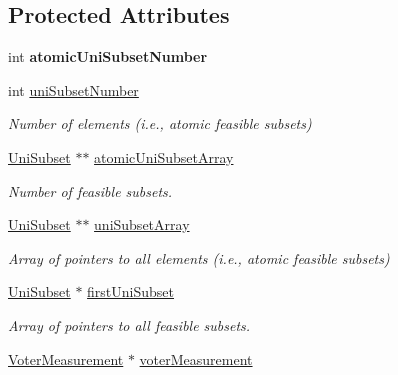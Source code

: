 \subsection*{Protected Attributes}
\begin{DoxyCompactItemize}
\item 
\hypertarget{classUniSet_addac67921c058dc9ffa2074b3d59151f}{int {\bfseries atomic\-Uni\-Subset\-Number}}\label{classUniSet_addac67921c058dc9ffa2074b3d59151f}

\item 
\hypertarget{classUniSet_a159ec0413efd05616c2f2445b7d8b2b5}{int \hyperlink{classUniSet_a159ec0413efd05616c2f2445b7d8b2b5}{uni\-Subset\-Number}}\label{classUniSet_a159ec0413efd05616c2f2445b7d8b2b5}

\begin{DoxyCompactList}\small\item\em Number of elements (i.\-e., atomic feasible subsets) \end{DoxyCompactList}\item 
\hypertarget{classUniSet_a16746d02b5503c5d8c62fe4dff46c5b3}{\hyperlink{classUniSubset}{Uni\-Subset} $\ast$$\ast$ \hyperlink{classUniSet_a16746d02b5503c5d8c62fe4dff46c5b3}{atomic\-Uni\-Subset\-Array}}\label{classUniSet_a16746d02b5503c5d8c62fe4dff46c5b3}

\begin{DoxyCompactList}\small\item\em Number of feasible subsets. \end{DoxyCompactList}\item 
\hypertarget{classUniSet_a154ae422d9f248c8b50f39d575f9b3c0}{\hyperlink{classUniSubset}{Uni\-Subset} $\ast$$\ast$ \hyperlink{classUniSet_a154ae422d9f248c8b50f39d575f9b3c0}{uni\-Subset\-Array}}\label{classUniSet_a154ae422d9f248c8b50f39d575f9b3c0}

\begin{DoxyCompactList}\small\item\em Array of pointers to all elements (i.\-e., atomic feasible subsets) \end{DoxyCompactList}\item 
\hypertarget{classUniSet_a8b2ca464176feddcd8d96c75514eba6b}{\hyperlink{classUniSubset}{Uni\-Subset} $\ast$ \hyperlink{classUniSet_a8b2ca464176feddcd8d96c75514eba6b}{first\-Uni\-Subset}}\label{classUniSet_a8b2ca464176feddcd8d96c75514eba6b}

\begin{DoxyCompactList}\small\item\em Array of pointers to all feasible subsets. \end{DoxyCompactList}\item 
\hypertarget{classUniSet_a7c4bf064154e0a7baf8126b7fbe56d24}{\hyperlink{classVoterMeasurement}{Voter\-Measurement} $\ast$ \hyperlink{classUniSet_a7c4bf064154e0a7baf8126b7fbe56d24}{voter\-Measurement}}\label{classUniSet_a7c4bf064154e0a7baf8126b7fbe56d24}


\end{DoxyCompactItemize}
